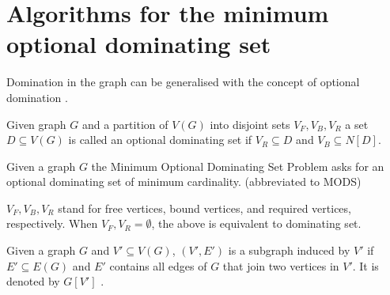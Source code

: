 \section{Algorithms for the minimum optional dominating set}
Domination in the graph can be generalised with the concept of optional domination \cite{SCHIERMEYER20083291}.
\begin{definition}
    Given graph $G$ and a partition of $V(G)$ into disjoint sets $V_F, V_B, V_R$ a set $D \subseteq V(G)$ is called an optional dominating set if $V_R \subseteq D$ and $V_B \subseteq N[D]$.
\end{definition}
\begin{definition}
Given a graph $G$ the Minimum Optional Dominating Set Problem asks for an optional dominating set of minimum cardinality. (abbreviated to MODS)
\end{definition}
$V_F, V_B, V_R$ stand for free vertices, bound vertices, and required vertices, respectively.
When $V_F, V_R = \emptyset$, the above is equivalent to dominating set. 

\begin{definition}
    Given a graph $G$ and $V' \subseteq V(G)$, $(V', E')$ is a subgraph induced by $V'$ if $E' \subseteq E(G)$ and $E'$ contains all edges of $G$ that join two vertices in $V'$. It is denoted by $G[V']$ \cite{bollobas1998modern}.
\end{definition}

